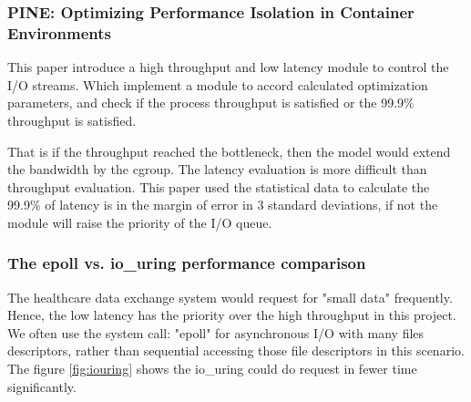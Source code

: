 \documentclass[12pt,a4paper]{article}
\begin{document}
\subsubsection{PINE: Optimizing Performance Isolation in Container Environments}
This paper \cite{Optimizing} introduce a high throughput and low latency module to control
the I/O streams. Which implement a module to accord calculated optimization parameters,
and check if the process throughput is satisfied or the 99.9\% throughput is satisfied.

That is if the throughput reached the bottleneck, then the model would extend the
bandwidth by the cgroup. The latency evaluation is more difficult than throughput
evaluation. This paper \cite{Optimizing} used the statistical data to calculate the
99.9\% of latency is in the margin of error in 3 standard deviations, if not the
module will raise the priority of the I/O queue.

\subsubsection{The epoll vs. io\_uring performance comparison}
The healthcare data exchange system would request for "small data" frequently.
Hence, the low latency has the priority over the high throughput in this project.
We often use the system call: "epoll" for asynchronous I/O with many files
descriptors, rather than sequential accessing those file descriptors in this scenario.
The figure \ref*{fig:iouring} \cite{epoll_vs_iouring} shows the io\_uring could do request in fewer time
significantly.
\end{document}
